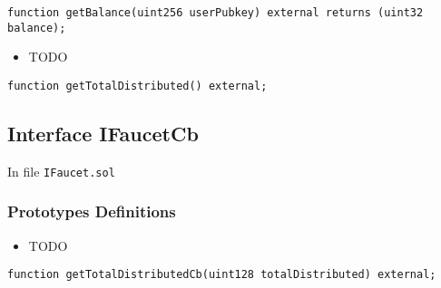 \begin{lstlisting}[firstnumber=8]
    function getBalance(uint256 userPubkey) external returns (uint32 balance);
\end{lstlisting}
\begin{itemize}
\item TODO
\end{itemize}

\begin{lstlisting}[firstnumber=5]
    function getTotalDistributed() external;
\end{lstlisting}

\subsection{Interface IFaucetCb}

\minitoc

In file {\tt IFaucet.sol}

\subsubsection{Prototypes Definitions}

\begin{itemize}
\item TODO
\end{itemize}

\begin{lstlisting}[firstnumber=12]
    function getTotalDistributedCb(uint128 totalDistributed) external;
\end{lstlisting}
